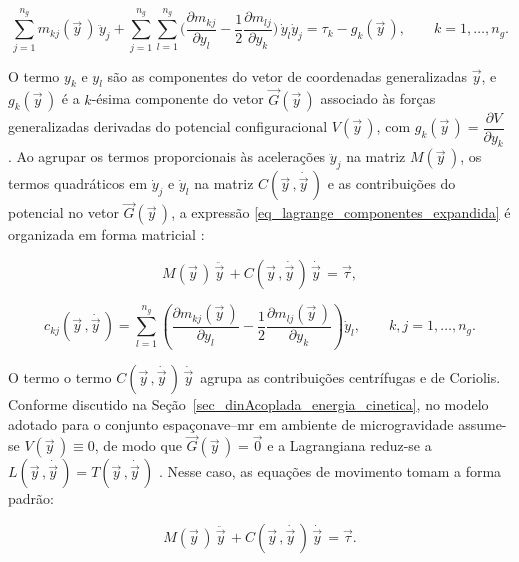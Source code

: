 \begin{equation}
\sum_{j=1}^{n_g}
m_{kj}(\vec y\,)\,\ddot y_j
+
\sum_{j=1}^{n_g}\sum_{l=1}^{n_g}
\bigg(
\frac{\partial m_{kj}}{\partial y_l}
-
\frac{1}{2}\frac{\partial m_{lj}}{\partial y_k}
\bigg)\,\dot y_l \dot y_j
=
\tau_k - g_k(\vec y\,),
\qquad
k = 1,\dots,n_g.
\label{eq_lagrange_componentes_expandida}
\end{equation}

O termo $y_k$ e $y_l$ são as componentes do vetor de coordenadas generalizadas
$\vec y$, e $g_k(\vec y\,)$ é a $k$-ésima componente do vetor
$\vec G(\vec y\,)$ associado às forças generalizadas derivadas do
potencial configuracional $V(\vec y\,)$, com
$g_k(\vec y\,) = \dfrac{\partial V}{\partial y_k}$ \cite{Geradin2004}.
Ao agrupar os termos proporcionais às acelerações $\ddot y_j$ na matriz
$M(\vec y\,)$, os termos quadráticos em $\dot y_j$ e $\dot y_l$ na
matriz $C(\vec y\,,\dot{\vec y\,})$ e as contribuições do potencial no
vetor $\vec G(\vec y\,)$, a expressão
\eqref{eq_lagrange_componentes_expandida} é organizada em forma
matricial \cite{Geradin2004}:

\begin{equation}
M(\vec y\,)\,\ddot{\vec y\,}
+
C(\vec y\,,\dot{\vec y\,})\,\dot{\vec y\,}
=
\vec\tau,
\label{eq_dinamica_geral_com_G}
\end{equation}

\begin{equation}
c_{kj}(\vec y\,,\dot{\vec y\,})
=
\sum_{l=1}^{n_g}
\left(
\frac{\partial m_{kj}(\vec y\,)}{\partial y_l}
-
\frac{1}{2}\frac{\partial m_{lj}(\vec y\,)}{\partial y_k}
\right)\dot y_l,
\qquad
k,j = 1,\dots,n_g.
\label{eq_coeficientes_C_geradin}
\end{equation}

O termo o termo $C(\vec y\,,\dot{\vec y\,})\,\dot{\vec y\,}$ agrupa as contribuições centrífugas e de Coriolis.
Conforme discutido na Seção~\ref{sec_dinAcoplada_energia_cinetica},
no modelo adotado para o conjunto espaçonave--\gls{mr} em ambiente de
microgravidade assume-se $V(\vec y\,) \equiv 0$, de modo que
$\vec G(\vec y\,) = \vec 0$ e a Lagrangiana reduz-se a
$L(\vec y\,,\dot{\vec y\,}) = T(\vec y\,,\dot{\vec y\,})$
\cite{wie2008space,murray1994mathematical}.
Nesse caso, as equações de movimento tomam a forma padrão:

\begin{equation}
M(\vec y\,)\,\ddot{\vec y\,}
+
C(\vec y\,,\dot{\vec y\,})\,\dot{\vec y\,}
=
\vec\tau.
\label{eq_dinamica_geral}
\end{equation}

